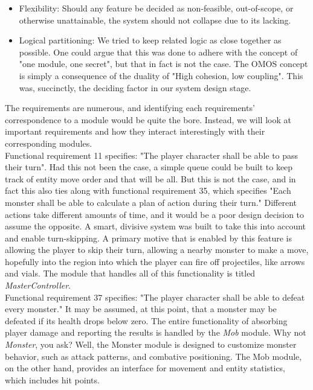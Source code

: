 \documentclass[12pt, titlepage]{article}
\begin{document}
    \begin{itemize}
        \item Flexibility: Should any feature be decided as non-feasible, out-of-scope, or otherwise unattainable, the system should not collapse due to its lacking.
        \item Logical partitioning: We tried to keep related logic as close together as possible. One could argue that this was done to adhere with the concept of "one module, one secret", but that in fact is not the case. The OMOS concept is simply a consequence of the duality of "High cohesion, low coupling". This was, succinctly, the deciding factor in our system design stage.
    \end{itemize}

    The requirements are numerous, and identifying each requirements' correspondence to a module would be quite the bore. Instead, we will look at important requirements and how they interact interestingly with their corresponding modules.\\

    Functional requirement 11 specifies: "The player character shall be able to pass their turn". Had this not been the case, a simple queue could be built to keep track of entity move order and that will be all. But this is not the case, and in fact this also ties along with functional requirement 35, which specifies "Each monster shall be able to calculate a plan of action during their turn." Different actions take different amounts of time, and it would be a poor design decision to assume the opposite. A smart, divisive system was built to take this into account and enable turn-skipping. A primary motive that is enabled by this feature is allowing the player to skip their turn, allowing a nearby monster to make a move, hopefully into the region into which the player can fire off projectiles, like arrows and vials. The module that handles all of this functionality is titled \textit{MasterController}.\\

    Functional requirement 37 specifies: "The player character shall be able to defeat every monster." It may be assumed, at this point, that a monster may be defeated if its health drops below zero. The entire functionality of absorbing player damage and reporting the results is handled by the \textit{Mob} module. Why not \textit{Monster}, you ask? Well, the Monster module is designed to customize monster behavior, such as attack patterns, and combative positioning. The Mob module, on the other hand, provides an interface for movement and entity statistics, which includes hit points.\\
\end{document}
